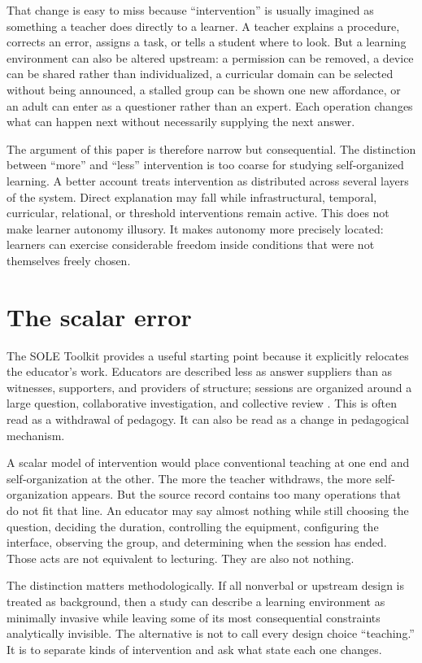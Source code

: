 \documentclass[11pt]{article}
\begin{document}
That change is easy to miss because ``intervention'' is usually imagined as something a teacher does directly to a learner. A teacher explains a procedure, corrects an error, assigns a task, or tells a student where to look. But a learning environment can also be altered upstream: a permission can be removed, a device can be shared rather than individualized, a curricular domain can be selected without being announced, a stalled group can be shown one new affordance, or an adult can enter as a questioner rather than an expert. Each operation changes what can happen next without necessarily supplying the next answer.

The argument of this paper is therefore narrow but consequential. The distinction between ``more'' and ``less'' intervention is too coarse for studying self-organized learning. A better account treats intervention as distributed across several layers of the system. Direct explanation may fall while infrastructural, temporal, curricular, relational, or threshold interventions remain active. This does not make learner autonomy illusory. It makes autonomy more precisely located: learners can exercise considerable freedom inside conditions that were not themselves freely chosen.

\section{The scalar error}
The SOLE Toolkit provides a useful starting point because it explicitly relocates the educator's work. Educators are described less as answer suppliers than as witnesses, supporters, and providers of structure; sessions are organized around a large question, collaborative investigation, and collective review \citep{mitra2015soletoolkit}. This is often read as a withdrawal of pedagogy. It can also be read as a change in pedagogical mechanism.

A scalar model of intervention would place conventional teaching at one end and self-organization at the other. The more the teacher withdraws, the more self-organization appears. But the source record contains too many operations that do not fit that line. An educator may say almost nothing while still choosing the question, deciding the duration, controlling the equipment, configuring the interface, observing the group, and determining when the session has ended. Those acts are not equivalent to lecturing. They are also not nothing.

The distinction matters methodologically. If all nonverbal or upstream design is treated as background, then a study can describe a learning environment as minimally invasive while leaving some of its most consequential constraints analytically invisible. The alternative is not to call every design choice ``teaching.'' It is to separate kinds of intervention and ask what state each one changes.
\end{document}
